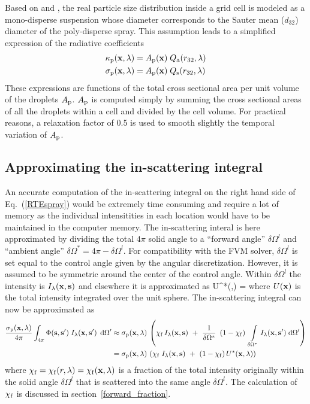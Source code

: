 Based on \cite{Collin} and \cite{Maruyama}, the real particle size distribution inside a grid cell is modeled as a mono-disperse suspension
whose diameter corresponds to the Sauter mean ($d_{32}$) diameter of the poly-disperse spray.
This assumption leads to a simplified expression of the radiative coefficients
\begin{align}
\kappa_{\rm p}({\mathbf{x}},\lambda) &= A_{\rm p}({\mathbf{x}}) \; Q_{\rm a}(r_{32},\lambda) \\
\sigma_{\rm p}({\mathbf{x}},\lambda) &= A_{\rm p}({\mathbf{x}}) \; Q_{\rm s}(r_{32},\lambda)
\end{align}
These expressions are functions of the total cross sectional area per unit volume of the droplets $A_{\rm p}$. $A_{\rm p}$ is computed simply by summing the cross sectional areas of all the droplets within a cell and divided by the cell volume. For practical reasons, a relaxation factor of 0.5 is
used to smooth slightly the temporal variation of $A_{\rm p}$.

\subsection{Approximating the in-scattering integral}

An accurate computation of the in-scattering integral on the right hand side of Eq.~(\ref{RTEspray}) would be extremely time
consuming and require a lot of memory as the individual intensitities in each location would have to be maintained in the computer memory.
The in-scattering interal is here approximated by dividing the total $4\pi$ solid angle to a ``forward angle'' $\delta\Omega^l$ and ``ambient angle''
$\delta\Omega^*=4\pi - \delta\Omega^l$.  For compatibility with the FVM solver, $\delta\Omega^l$ is set equal to the control angle given
by the angular discretization.  However, it is assumed to be symmetric around the center of the control angle.  Within $\delta\Omega^l$ the
intensity is $I_{\lambda}({\mathbf{x}},{\mathbf{s}})$ and elsewhere it is approximated as
\be
\label{Ustar}
U^*(\bx,\la) = 
\ee
where $U({\mathbf{x}})$ is the total intensity integrated over the unit sphere. The in-scattering
integral can now be approximated as
\begin{align}
\frac{\sigma_{\rm p}({\mathbf{x}},\lambda)}{4\pi}\int_{4\pi}\Phi({\mathbf{s}},{\mathbf{s}}') \; I_{\lambda}({\mathbf{x}},{\mathbf{s}}')
  \; \,\mathrm{d}\Omega'
  &\approx
\sigma_{\rm p}({\mathbf{x}},\lambda) \, \left( \chi_{\rm f} \, I_{\lambda}({\mathbf{x}},{\mathbf{s}}) ~+~\frac{1}{\delta\Omega^{*}}~\left(1-\chi_{\rm f}\right)~
\int\limits_{\delta\Omega^{*}} I_{\lambda}({\mathbf{x}},{\mathbf{s}}') \; \textrm{d} \Omega' \right)\\
  &=
\sigma_{\rm p}({\mathbf{x}},\lambda) \, \left( \chi_{\rm f} \; I_{\lambda}({\mathbf{x}},{\mathbf{s}}) ~+~
(1-\chi_{\rm f}) \, U^*({\mathbf{x}},\lambda) \right)
\label{SprayRTE_RHS}
\end{align}
where $\chi_{\rm f} = \chi_{\rm f}(r,\lambda)=\chi_{\rm f}({\mathbf{x}},\lambda)$ is a fraction of the total intensity originally within the solid angle $\delta\Omega^l$ that is scattered
into the same angle $\delta\Omega^l$. The calculation of $\chi_{\rm f}$ is discussed in section~\ref{forward_fraction}.

